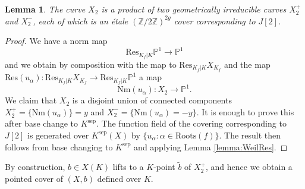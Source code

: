 \documentclass[11pt]{amsart}
\theoremstyle{plain}
\newtheorem{lemma}{Lemma}
\theoremstyle{definition}
\newcommand{\Roots}{\mathrm{Roots}}
\newcommand{\sep}{\mathrm{sep}}
\newcommand{\Nm}{\mathrm{Nm}}
\newcommand{\Res}{\mathrm{Res}}
\begin{document}
\begin{lemma}\label{lemma:X2}
The curve $X_2 $ is a product of two geometrically irreducible curves $X_2 ^+ $ and $X_2 ^-$, each of which is an \'etale $(\mathbb{Z}/2\mathbb{Z})^{2g}$ cover corresponding to $J[2]$.
\end{lemma}
\begin{proof}
We have a norm map
\[
\Res _{K_f |K}\mathbb{P}^1 \to \mathbb{P}^1
\]
and we obtain by composition with the map to $\Res _{K_f |K}X_{K_f }$ and the map $\Res (u_{\alpha }):\Res _{K_f |K}X_{K_f }\to \Res _{K_f |K}\mathbb{P}^1 $ a map
\[
\Nm (u_{\alpha }):X_2 \to \mathbb{P}^1 .
\]
We claim that $X_2 $ is a disjoint union of connected components $X_2 ^+ =\{ \Nm (u_{\alpha })\}=y$ and $X_2 ^- = \{ \Nm (u_{\alpha })=-y \}$. 
It is enough to prove this after base change to $K^{\sep }$. The function field of the covering corresponding to $J[2]$ is generated over $K^{\sep }(X)$ by $\{ u_{\alpha }:\alpha \in \Roots (f) \}$. The result then follows from base changing to $K^{\sep }$ and applying Lemma \ref{lemma:WeilRes}.
\end{proof}
By construction, $b\in X(K)$ lifts to a $K$-point $\widetilde{b}$ of $X_2 ^+$, and hence we obtain a pointed cover of $(X,b)$ defined over $K$.
\end{document}
